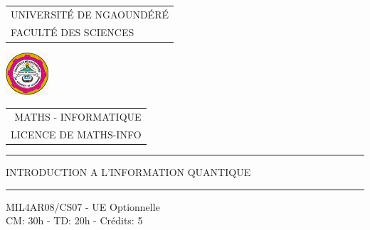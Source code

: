 \documentclass[12pt,a4paper,oneside,openany]{book}%
\numberwithin{equation}{section}
\numberwithin{figure}{section}
\numberwithin{table}{section}
\begin{document}
\frontmatter
\begin{titlepage}
\begin{small}
\begin{center}
 \begin{tabular}[h]{l}
  UNIVERSITÉ DE NGAOUNDÉRÉ \\FACULTÉ DES SCIENCES
 \end{tabular}
\hspace*{2em}
\begin{minipage}{2cm}
\includegraphics[width = 1.6cm]{graphics/LogoUN.png}
\end{minipage}
\hspace*{1em}
\begin{tabular}[h]{r}
  \\MATHS - INFORMATIQUE\\LICENCE DE MATHS-INFO
 \end{tabular}
\end{center}
\end{small}
\vspace*{5em}
\begin{center}
\color{black}\rule{14.75cm}{0.09cm}\color{black}
\bigskip

{\Huge INTRODUCTION A L'INFORMATION QUANTIQUE}

\color{black}\rule{12.55cm}{0.09cm}\color{black}

\vspace*{2em}

MIL4AR08/CS07 - UE Optionnelle\\ CM: 30h - TD: 20h - Crédits: 5\\


\end{center}
\end{titlepage}
\end{document}
